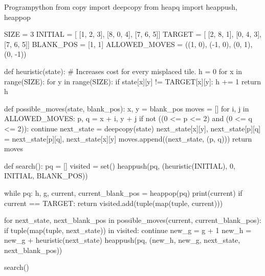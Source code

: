 \documentclass[11pt]{ipu-python}
\begin{document}
    \vspace*{-30pt}\vspace*{-10pt}%
    \begin{code}
        {Program}{python}
from copy import deepcopy
from heapq import heappush, heappop

SIZE = 3
INITIAL = [
    [1, 2, 3],
    [8, 0, 4],
    [7, 6, 5]]
TARGET = [
    [2, 8, 1],
    [0, 4, 3],
    [7, 6, 5]]
BLANK_POS = [1, 1]
ALLOWED_MOVES = ((1, 0), (-1, 0), (0, 1), (0, -1))


def heuristic(state):
    # Increases cost for every misplaced tile.
    h = 0
    for x in range(SIZE):
        for y in range(SIZE):
            if state[x][y] != TARGET[x][y]:
                h += 1
    return h


def possible_moves(state, blank_pos):
    x, y = blank_pos
    moves = []
    for i, j in ALLOWED_MOVES:
        p, q = x + i, y + j
        if not ((0 <= p <= 2) and (0 <= q <= 2)):
            continue
        next_state = deepcopy(state)
        next_state[x][y], next_state[p][q] = next_state[p][q], next_state[x][y]
        moves.append((next_state, (p, q)))
    return moves


def search():
    pq = []
    visited = set()
    heappush(pq, (heuristic(INITIAL), 0, INITIAL, BLANK_POS))

    while pq:
        h, g, current, current_blank_pos = heappop(pq)
        print(current)
        if current == TARGET:
            return
        visited.add(tuple(map(tuple, current)))

        for next_state, next_blank_pos in possible_moves(current, current_blank_pos):
            if tuple(map(tuple, next_state)) in visited:
                continue
            new_g = g + 1
            new_h = new_g + heuristic(next_state)
            heappush(pq, (new_h, new_g, next_state, next_blank_pos))


search()
    \end{code}%
\end{document}

